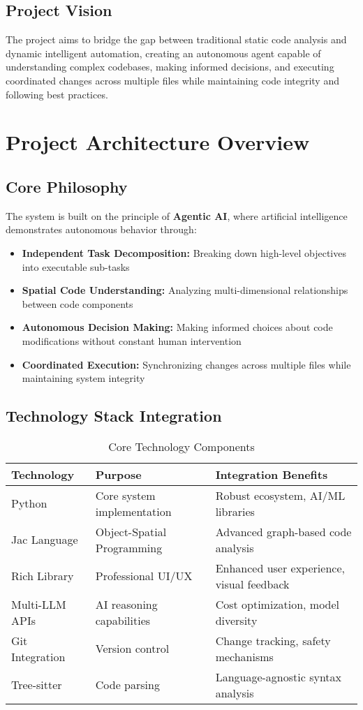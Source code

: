 \documentclass[12pt,a4paper]{article}
\begin{document}
\subsection{Project Vision}
The project aims to bridge the gap between traditional static code analysis and dynamic intelligent automation, creating an autonomous agent capable of understanding complex codebases, making informed decisions, and executing coordinated changes across multiple files while maintaining code integrity and following best practices.

\section{Project Architecture Overview}

\subsection{Core Philosophy}
The system is built on the principle of \textbf{Agentic AI}, where artificial intelligence demonstrates autonomous behavior through:
\begin{itemize}
    \item \textbf{Independent Task Decomposition:} Breaking down high-level objectives into executable sub-tasks
    \item \textbf{Spatial Code Understanding:} Analyzing multi-dimensional relationships between code components
    \item \textbf{Autonomous Decision Making:} Making informed choices about code modifications without constant human intervention
    \item \textbf{Coordinated Execution:} Synchronizing changes across multiple files while maintaining system integrity
\end{itemize}

\subsection{Technology Stack Integration}

\begin{table}[H]
\centering
\caption{Core Technology Components}
\begin{tabularx}{\textwidth}{|l|X|X|}
\hline
\textbf{Technology} & \textbf{Purpose} & \textbf{Integration Benefits} \\
\hline
Python & Core system implementation & Robust ecosystem, AI/ML libraries \\
\hline
Jac Language & Object-Spatial Programming & Advanced graph-based code analysis \\
\hline
Rich Library & Professional UI/UX & Enhanced user experience, visual feedback \\
\hline
Multi-LLM APIs & AI reasoning capabilities & Cost optimization, model diversity \\
\hline
Git Integration & Version control & Change tracking, safety mechanisms \\
\hline
Tree-sitter & Code parsing & Language-agnostic syntax analysis \\
\hline
\end{tabularx}
\end{table}
\end{document}
